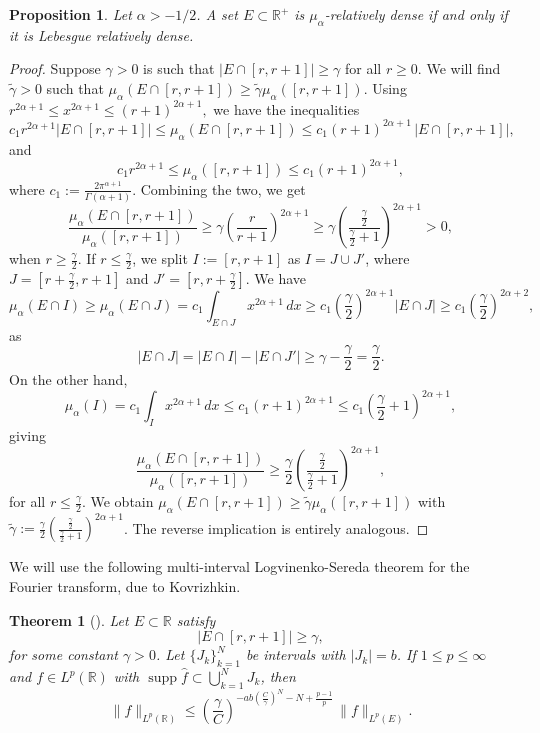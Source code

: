 \documentclass[11pt,a4paper,reqno,dvipsnames]{amsart}
\newcommand{\R}{\mathbb R}
\renewcommand{\ge}{\geqslant}
\renewcommand{\le}{\leqslant}
\numberwithin{equation}{section}
\theoremstyle{plain}
\newtheorem{theorem}[equation]{Theorem}
\newtheorem{proposition}[equation]{Proposition}
\theoremstyle{definition}
\theoremstyle{remark}
\begin{document}
\begin{proposition}
\label{relative-density-equivalence}
    Let $\alpha > -1/2$. A set $E \subset \R^+$ is $\mu_\alpha$-relatively dense if and only if it is Lebesgue relatively dense. 
\end{proposition}
\begin{proof}
    Suppose $\gamma > 0$ is such that $|E \cap [r, r+1]| \ge \gamma$ for all $r \ge 0$. We will find $\widetilde{\gamma} > 0$ such that $\mu_\alpha(E \cap [r,r+1]) \ge \widetilde{\gamma} \mu_\alpha([r,r+1])$. Using $r^{2\alpha + 1} \le x^{2\alpha + 1} \le (r+1)^{2\alpha + 1},$ we have the inequalities
    $$c_1 r^{2\alpha + 1} |E \cap [r,r+1]| \le \mu_\alpha(E \cap [r,r+1]) \le c_1 (r+1)^{2\alpha + 1}\, |E \cap [r,r+1]|,$$
    and $$c_1 r^{2\alpha + 1} \le \mu_\alpha([r,r+1]) \le c_1 (r+1)^{2\alpha + 1},$$
    where $c_1 := \frac{2\pi^{\alpha + 1}}{\Gamma(\alpha + 1)}$. Combining the two, we get
    $$\frac{\mu_\alpha(E \cap [r,r+1])}{\mu_\alpha([r,r+1])} \ge \gamma \left(\frac{r}{r+1}\right)^{2\alpha + 1}  \ge \gamma \left(\frac{\frac{\gamma}{2}}{\frac{\gamma}{2}+1}\right)^{2\alpha + 1} > 0,$$
    when $r \ge \frac{\gamma}{2}$. If $r \le \frac{\gamma}{2}$, we split $I := [r,r+1]$ as $I = J \cup J'$, where $J = [r + \frac{\gamma}{2}, r + 1]$ and $J' = [r, r+ \frac{\gamma}{2}]$. We have $$\mu_\alpha(E \cap I) \ge \mu_\alpha(E \cap J) = c_1\int_{E \cap J} x^{2\alpha + 1}\, dx \ge c_1 \left(\frac{\gamma}{2} \right)^{2\alpha + 1} |E \cap J| \ge c_1 \left(\frac{\gamma}{2} \right)^{2\alpha + 2},$$
    as
    $$|E \cap J| = |E \cap I| - |E \cap J'| \ge \gamma - \frac{\gamma}{2} = \frac{\gamma}{2}.$$
    On the other hand, $$\mu_\alpha(I) = c_1\int_I x^{2\alpha + 1}\, dx \le c_1 (r+1)^{2\alpha + 1} \le c_1 \left(\frac{\gamma}{2} + 1 \right)^{2\alpha + 1},$$
    giving 
    $$\frac{\mu_\alpha(E \cap [r,r+1])}{\mu_\alpha([r,r+1])} \ge \frac{\gamma}{2} \left(\frac{\frac{\gamma}{2}}{\frac{\gamma}{2}+1}\right)^{2\alpha + 1},$$
    for all $r \le \frac{\gamma}{2}$. We obtain $\mu_\alpha(E \cap [r,r+1]) \ge \widetilde{\gamma} \mu_\alpha([r,r+1])$ with $\widetilde{\gamma} := \frac{\gamma}{2} \left(\frac{\frac{\gamma}{2}}{\frac{\gamma}{2}+1}\right)^{2\alpha + 1}$. The reverse implication is entirely analogous.
\end{proof}

We will use the following multi-interval Logvinenko-Sereda theorem for the Fourier transform, due to Kovrizhkin.
\begin{theorem}[\cite{k1}]
    \label{multi-interval-pls}
    Let $E\subset \R$ satisfy $$|E \cap [r,r+1]| \ge \gamma,$$
    for some constant $\gamma > 0$. 
    Let $\{J_k\}_{k=1}^N$ be intervals with $|J_k| = b$. If $1\le p \le \infty$ and $f\in L^p(\R)$ with $\operatorname{supp} \widehat{f} \subset \bigcup_{k=1}^N J_k$, then 
    $$\|f\|_{L^p(\R)} \le \left(\frac{\gamma}{C}\right)^{-ab \left(\frac{C}{\gamma}\right)^N - N + \frac{p-1}{p}}\, \|f\|_{L^p(E)}.$$
\end{theorem}
\end{document}
